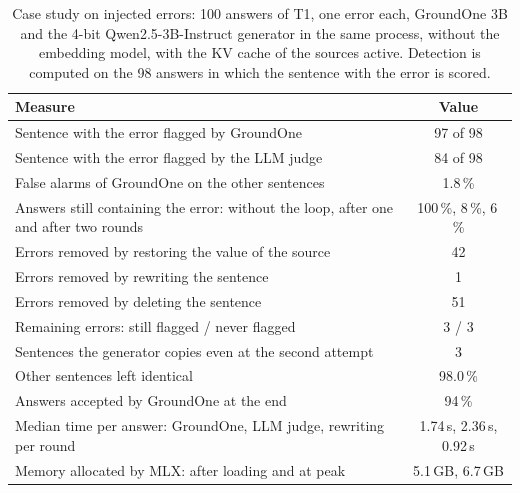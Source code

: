 \begin{table}[htbp]
\centering
\caption{Case study on injected errors: 100 answers of T1, one error each, GroundOne 3B and the 4-bit
Qwen2.5-3B-Instruct generator in the same process, without the embedding model, with the KV cache of the sources active. Detection is computed on the 98 answers in which the sentence with the error is scored.}
\label{tab:studio-casestudy}
\small
\begin{tabular}{>{\raggedright\arraybackslash}p{9.4cm}c}
\toprule
Measure & Value \\
\midrule
Sentence with the error flagged by GroundOne & 97 of 98 \\
Sentence with the error flagged by the LLM judge & 84 of 98 \\
False alarms of GroundOne on the other sentences & 1.8\,\% \\
Answers still containing the error: without the loop, after one and after two rounds & 100\,\%, 8\,\%, 6\,\% \\
Errors removed by restoring the value of the source & 42 \\
Errors removed by rewriting the sentence & 1 \\
Errors removed by deleting the sentence & 51 \\
Remaining errors: still flagged / never flagged & 3 / 3 \\ 
Sentences the generator copies even at the second attempt & 3 \\
Other sentences left identical & 98.0\,\% \\
Answers accepted by GroundOne at the end & 94\,\% \\
Median time per answer: GroundOne, LLM judge, rewriting per round & 1.74\,s, 2.36\,s, 0.92\,s \\
Memory allocated by MLX: after loading and at peak & 5.1\,GB, 6.7\,GB \\
\bottomrule
\end{tabular}
\end{table}

